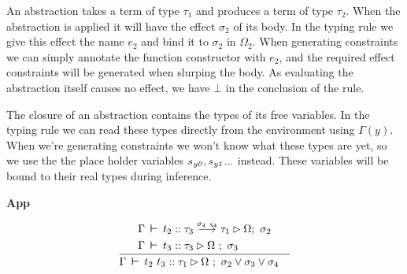 \vspace{-4em}
An abstraction takes a term of type $\tau_1$ and produces a term of type $\tau_2$. When the abstraction is applied it will have the effect $\sigma_2$ of its body. In the typing rule we give this effect the name $e_2$ and bind it to $\sigma_2$ in $\Omega_2$. When generating constraints we can simply annotate the function constructor with $e_2$, and the required effect constraints will be generated when slurping the body. As evaluating the abstraction itself causes no effect, we have $\bot$ in the conclusion of the rule.

The closure of an abstraction contains the types of its free variables. In the typing rule we can read these types directly from the environment using $\Gamma(y)$. When we're generating constraints we won't know what these types are yet, so we use the the place holder variables $s_{\operatorname{\mathit{y0}}}, s_{\operatorname{\mathit{y1}}} ...$ instead. These variables will be bound to their real types during inference.

\bigskip
\textbf{App}

$$
\begin{aligned}
	\frac	{\begin{aligned}
			\Gamma & \judge t_2 :: \tau_3 \lfuna{\sigma_4 \ \varsigma_4} \tau_1 \rhd \Omega
					; \ \sigma_2  \\
			\Gamma & \judge t_3 :: \tau_3 \rhd \Omega \ ; \ \sigma_3 
		 \end{aligned}
		}
		{ \begin{aligned}
		  	\Gamma & \judge t_2 \ t_3 :: \tau_1 \rhd \Omega \ ; \ \sigma_2 \lor \sigma_3 \lor \sigma_4
		  \end{aligned}
		}
\end{aligned}
$$

